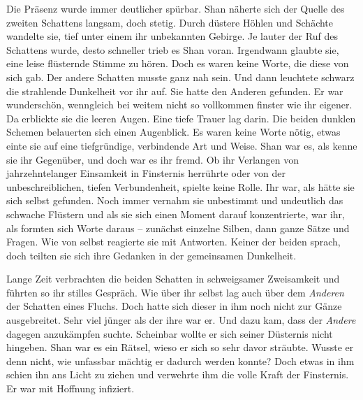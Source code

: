 \documentclass[10pt, a4paper, oneside]{book}
\begin{document}
\begin{multicols}{2}
Die Präsenz wurde immer deutlicher spürbar. Shan näherte sich der Quelle des zweiten Schattens langsam, doch stetig. Durch düstere Höhlen und Schächte wandelte sie, tief unter einem ihr unbekannten Gebirge. Je lauter der Ruf des Schattens wurde, desto schneller trieb es Shan voran. Irgendwann glaubte sie, eine leise flüsternde Stimme zu hören. Doch es waren keine Worte, die diese von sich gab. Der andere Schatten musste ganz nah sein. Und dann leuchtete schwarz die strahlende Dunkelheit vor ihr auf. Sie hatte den Anderen gefunden. Er war wunderschön, wenngleich bei weitem nicht so vollkommen finster wie ihr eigener. Da erblickte sie die leeren Augen. Eine tiefe Trauer lag darin. Die beiden dunklen Schemen belauerten sich einen Augenblick. Es waren keine Worte nötig, etwas einte sie auf eine tiefgründige, verbindende Art und Weise. Shan war es, als kenne sie ihr Gegenüber, und doch war es ihr fremd. Ob ihr Verlangen von jahrzehntelanger Einsamkeit in Finsternis herrührte oder von der unbeschreiblichen, tiefen Verbundenheit, spielte keine Rolle. Ihr war, als hätte sie sich selbst gefunden. Noch immer vernahm sie unbestimmt und undeutlich das schwache Flüstern und als sie sich einen Moment darauf konzentrierte, war ihr, als formten sich Worte daraus – zunächst einzelne Silben, dann ganze Sätze und Fragen. Wie von selbst reagierte sie mit Antworten. Keiner der beiden sprach, doch teilten sie sich ihre Gedanken in der gemeinsamen Dunkelheit.\bigskip

Lange Zeit verbrachten die beiden Schatten in schweigsamer Zweisamkeit und führten so ihr stilles Gespräch. Wie über ihr selbst lag auch über dem \textit{Anderen} der Schatten eines Fluchs. Doch hatte sich dieser in ihm noch nicht zur Gänze ausgebreitet. Sehr viel jünger als der ihre war er. Und dazu kam, dass der \textit{Andere} dagegen anzukämpfen suchte. Scheinbar wollte er sich seiner Düsternis nicht hingeben. Shan war es ein Rätsel, wieso er sich so sehr davor sträubte. Wusste er denn nicht, wie unfassbar mächtig er dadurch werden konnte? Doch etwas in ihm schien ihn ans Licht zu ziehen und verwehrte ihm die volle Kraft der Finsternis. Er war mit Hoffnung infiziert.\bigskip


\end{multicols}
\end{document}
